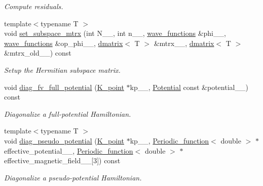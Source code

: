 \begin{DoxyCompactItemize}
\begin{DoxyCompactList}\small\item\em Compute residuals. \end{DoxyCompactList}\item 
{\footnotesize template$<$typename T $>$ }\\void \hyperlink{classsirius_1_1_band_a8577610940fce37a4d7827fd32e51b51}{set\+\_\+subspace\+\_\+mtrx} (int N\+\_\+\+\_\+, int n\+\_\+\+\_\+, \hyperlink{classsddk_1_1wave__functions}{wave\+\_\+functions} \&phi\+\_\+\+\_\+, \hyperlink{classsddk_1_1wave__functions}{wave\+\_\+functions} \&op\+\_\+phi\+\_\+\+\_\+, \hyperlink{classsddk_1_1dmatrix}{dmatrix}$<$ T $>$ \&mtrx\+\_\+\+\_\+, \hyperlink{classsddk_1_1dmatrix}{dmatrix}$<$ T $>$ \&mtrx\+\_\+old\+\_\+\+\_\+) const 
\begin{DoxyCompactList}\small\item\em Setup the Hermitian subspace matrix. \end{DoxyCompactList}\item 
void \hyperlink{classsirius_1_1_band_a415d6ffa282be7b91720adae3a33250c}{diag\+\_\+fv\+\_\+full\+\_\+potential} (\hyperlink{classsirius_1_1_k__point}{K\+\_\+point} $\ast$kp\+\_\+\+\_\+, \hyperlink{classsirius_1_1_potential}{Potential} const \&potential\+\_\+\+\_\+) const 
\begin{DoxyCompactList}\small\item\em Diagonalize a full-\/potential Hamiltonian. \end{DoxyCompactList}\item 
{\footnotesize template$<$typename T $>$ }\\void \hyperlink{classsirius_1_1_band_a5a0cd8e4ed5eaa76c886ea3f9c62865e}{diag\+\_\+pseudo\+\_\+potential} (\hyperlink{classsirius_1_1_k__point}{K\+\_\+point} $\ast$kp\+\_\+\+\_\+, \hyperlink{classsirius_1_1_periodic__function}{Periodic\+\_\+function}$<$ double $>$ $\ast$effective\+\_\+potential\+\_\+\+\_\+, \hyperlink{classsirius_1_1_periodic__function}{Periodic\+\_\+function}$<$ double $>$ $\ast$effective\+\_\+magnetic\+\_\+field\+\_\+\+\_\+\mbox{[}3\mbox{]}) const 
\begin{DoxyCompactList}\small\item\em Diagonalize a pseudo-\/potential Hamiltonian. \end{DoxyCompactList}\end{DoxyCompactItemize}
